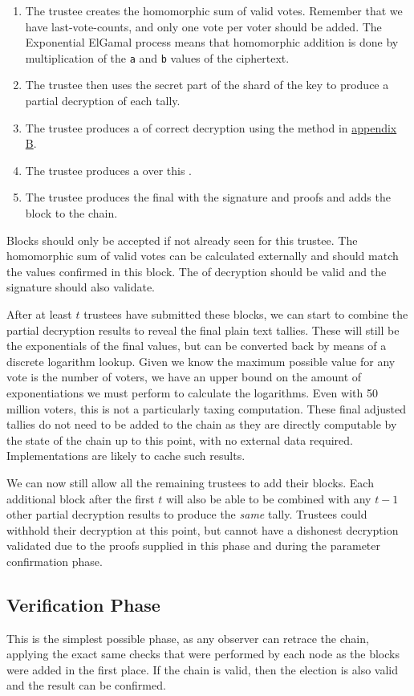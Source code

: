 \begin{enumerate}
    \item The trustee creates the homomorphic sum of valid votes. Remember that we have last-vote-counts, and only one vote per voter should be added. The Exponential ElGamal process means that homomorphic addition is done by multiplication of the \texttt{a} and \texttt{b} values of the ciphertext.
    \item The trustee then uses the secret part of the shard of the key to produce a partial decryption of each tally.
    \item The trustee produces a  of correct decryption using the method in \hyperref[proc:zkp:dec]{appendix B}.
    \item The trustee produces a  over this .
    \item The trustee produces the final  with the signature and proofs and adds the block to the chain.
\end{enumerate}

Blocks should only be accepted if not already seen for this trustee. The homomorphic sum of valid votes can be calculated externally and should match the values confirmed in this block. The  of decryption should be valid and the signature should also validate.

After at least $t$ trustees have submitted these blocks, we can start to combine the partial decryption results to reveal the final plain text tallies. These will still be the exponentials of the final values, but can be converted back by means of a discrete logarithm lookup. Given we know the maximum possible value for any vote is the number of voters, we have an upper bound on the amount of exponentiations we must perform to calculate the logarithms. Even with 50 million voters, this is not a particularly taxing computation. These final adjusted tallies do not need to be added to the chain as they are directly computable by the state of the chain up to this point, with no external data required. Implementations are likely to cache such results.

We can now still allow all the remaining trustees to add their blocks. Each additional block after the first $t$ will also be able to be combined with any $t - 1$ other partial decryption results to produce the \emph{same} tally. Trustees could withhold their decryption at this point, but cannot have a dishonest decryption validated due to the proofs supplied in this phase and during the parameter confirmation phase.


\subsection{Verification Phase}
\label{ch:astris:detail:verify}

This is the simplest possible phase, as any observer can retrace the chain, applying the exact same checks that were performed by each node as the blocks were added in the first place. If the chain is valid, then the election is also valid and the result can be confirmed.

